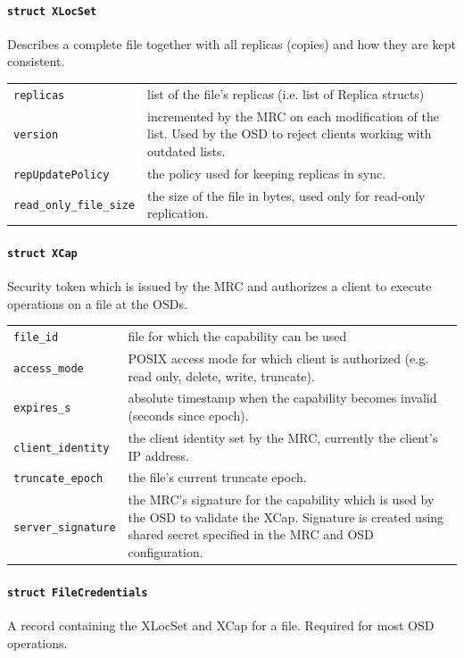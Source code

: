 \paragraph{\texttt{struct XLocSet}}
Describes a complete file together with all replicas (copies) and how they are kept consistent.

\begin{tabularx}{\textwidth}{lX}
 \texttt{replicas} & list of the file's replicas (i.e. list of Replica structs)\\
 \texttt{version} & incremented by the MRC\index{MRC} on each modification of the list. Used by the OSD\index{OSD} to reject clients working with outdated lists.\\
 \texttt{repUpdatePolicy} & the policy used for keeping replicas in sync. \\
 \texttt{read\_only\_file\_size} & the size of the file in bytes, used only for read-only replication.
\end{tabularx}


\paragraph{\texttt{struct XCap}}
Security token which is issued by the MRC and authorizes a client to execute operations on a file at the OSDs.

\begin{tabularx}{\textwidth}{lX}
 \texttt{file\_id} & file for which the capability can be used\\
 \texttt{access\_mode} & POSIX\index{POSIX} access mode for which client is authorized (e.g. read only, delete, write, truncate).\\
 \texttt{expires\_s} & absolute timestamp when the capability becomes invalid (seconds since epoch). \\
 \texttt{client\_identity} & the client identity set by the MRC\index{MRC}, currently the client's IP address. \\
 \texttt{truncate\_epoch} & the file's current truncate epoch. \\
 \texttt{server\_signature} & the MRC's\index{MRC} signature for the capability which is used by the OSD\index{OSD} to validate the XCap. Signature is created using shared secret specified in the MRC\index{MRC} and OSD\index{OSD} configuration. \\
\end{tabularx}



\paragraph{\texttt{struct FileCredentials}}
A record containing the XLocSet and XCap for a file. Required for most OSD operations.

